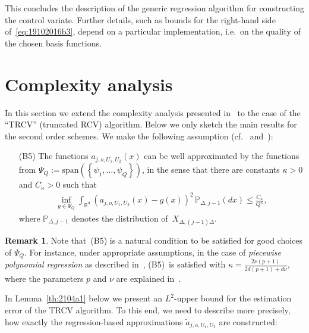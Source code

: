 \documentclass[11pt,a4paper]{amsart}
\theoremstyle{plain}
\theoremstyle{definition}
\newtheorem{remark}[theorem]{Remark}
\theoremstyle{remark}
\numberwithin{equation}{section}
\newcommand*{\PP}{\mathbb P}
\renewcommand*{\doteq}{:=}
\begin{document}
This concludes the description
of the generic regression algorithm
for constructing the control variate.
Further details,
such as bounds for the right-hand side
of~\eqref{eq:19102016b3},
depend on a particular implementation,
i.e.\ on the quality of the chosen basis functions.

\section{Complexity analysis}
\label{sec:compl}

In this section we extend
the complexity analysis presented
in~\cite{belomestny2016variance}
to the case of the ``TRCV'' (truncated RCV) algorithm.
Below we only sketch the main results
for the second order schemes.
We make the following assumption (cf.~\cite{belomestny2016dual} and~\cite{belomestny2016stratified}):
\begin{itemize}
\item[(B5)]
The functions \(a_{j,o,U_1,U_2}\left(x\right)\) can be
well approximated by the functions from
$\Psi_{Q}\doteq\text{span}\left(\left\{\psi_{1},\ldots,\psi_{Q}\right\}\right)$,
in the sense that there are constants
$\kappa>0$ and $C_\kappa>0$ such that
\begin{align*}
\inf_{g\in\Psi_{Q}}\int_{\mathbb{R}^d}\left(a_{j,o,U_1,U_2}\left(x
\right)-g\left(x\right)\right)^2\,\PP_{\Delta,j-1}(dx)\leq  \frac{C_\kappa}{Q^{\kappa}},
\end{align*}
where $\PP_{\Delta,j-1}$
denotes the distribution of~$X_{\Delta,(j-1)\Delta}$.
\end{itemize}

\begin{remark}\label{rem:1301a1}
Note that~(B5) is a natural condition to be satisfied
for good choices of $\Psi_Q$.
For instance, under appropriate assumptions,
in the case of
\emph{piecewise polynomial regression}
as described in~\cite{belomestny2016variance}, 
(B5)~is satisfied with
$\kappa=\frac{2\nu(p+1)}{2d(p+1)+d\nu}$,
where the parameters $p$ and $\nu$
are explained in~\cite{belomestny2016variance}.
\end{remark}

In Lemma~\ref{th:2104a1}
below we present an $L^2$-upper bound
for the estimation error of the TRCV algorithm.
To this end, we need to describe more precisely,
how exactly the regression-based approximations
$\tilde a_{j,o,U_1,U_2}$ are constructed:
\end{document}
